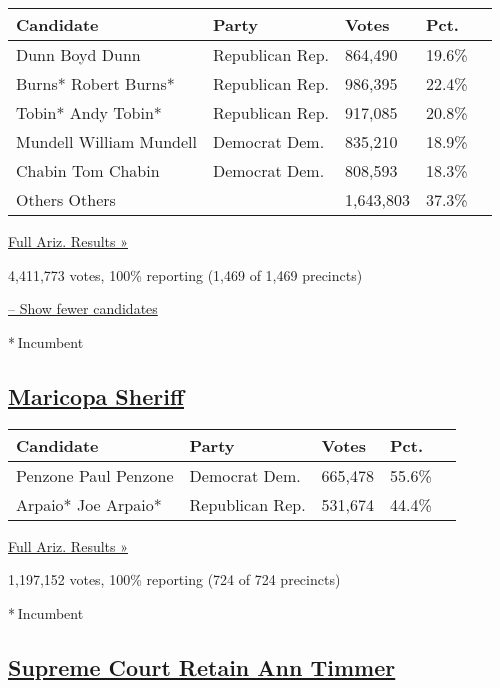 \begin{longtable}[]{@{}lllll@{}}
\toprule
Candidate & Party & Votes & Pct. &\tabularnewline
\midrule
\endhead
 Dunn Boyd Dunn & Republican Rep. & 864,490 & 19.6\% &\tabularnewline
 Burns* Robert Burns* & Republican Rep. & 986,395 & 22.4\%
&\tabularnewline
 Tobin* Andy Tobin* & Republican Rep. & 917,085 & 20.8\%
&\tabularnewline
 Mundell William Mundell & Democrat Dem. & 835,210 & 18.9\%
&\tabularnewline
 Chabin Tom Chabin & Democrat Dem. & 808,593 & 18.3\% &\tabularnewline
 Others Others & & 1,643,803 & 37.3\% &\tabularnewline
\bottomrule
\end{longtable}

\href{https://www.nytimes.com/elections/2016/results/arizona}{Full Ariz.
Results »}

4,411,773 votes, 100\% reporting (1,469 of 1,469 precincts)

\protect\hyperlink{}{-- Show fewer candidates}

* Incumbent

\hypertarget{maricopa-sheriff}{%
\subsection{\texorpdfstring{\href{https://www.nytimes.com/elections/2016/results/arizona-sheriff-maricopa}{Maricopa
Sheriff}}{Maricopa Sheriff}}\label{maricopa-sheriff}}

\begin{longtable}[]{@{}lllll@{}}
\toprule
Candidate & Party & Votes & Pct. &\tabularnewline
\midrule
\endhead
 Penzone Paul Penzone & Democrat Dem. & 665,478 & 55.6\%
&\tabularnewline
 Arpaio* Joe Arpaio* & Republican Rep. & 531,674 & 44.4\%
&\tabularnewline
\bottomrule
\end{longtable}

\href{https://www.nytimes.com/elections/2016/results/arizona}{Full Ariz.
Results »}

1,197,152 votes, 100\% reporting (724 of 724 precincts)

* Incumbent

\hypertarget{supreme-court-retain-ann-timmer}{%
\subsection{\texorpdfstring{\href{https://www.nytimes.com/elections/2016/results/arizona-supreme-court-retain-ann-timmer}{Supreme
Court Retain Ann
Timmer}}{Supreme Court Retain Ann Timmer}}\label{supreme-court-retain-ann-timmer}}

